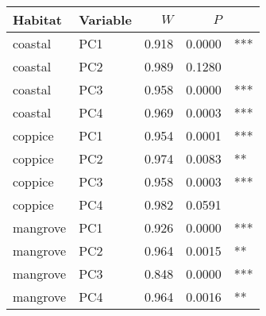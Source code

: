 
\begin{tabular}{llrrl}
\toprule
Habitat & Variable & $W$ & $P$ & \\
\midrule
coastal & PC1 & 0.918 & 0.0000 & ***\\
coastal & PC2 & 0.989 & 0.1280 & \\
coastal & PC3 & 0.958 & 0.0000 & ***\\
coastal & PC4 & 0.969 & 0.0003 & ***\\
coppice & PC1 & 0.954 & 0.0001 & ***\\
coppice & PC2 & 0.974 & 0.0083 & **\\
coppice & PC3 & 0.958 & 0.0003 & ***\\
coppice & PC4 & 0.982 & 0.0591 & \\
mangrove & PC1 & 0.926 & 0.0000 & ***\\
mangrove & PC2 & 0.964 & 0.0015 & **\\
mangrove & PC3 & 0.848 & 0.0000 & ***\\
mangrove & PC4 & 0.964 & 0.0016 & **\\
\bottomrule
\end{tabular}
